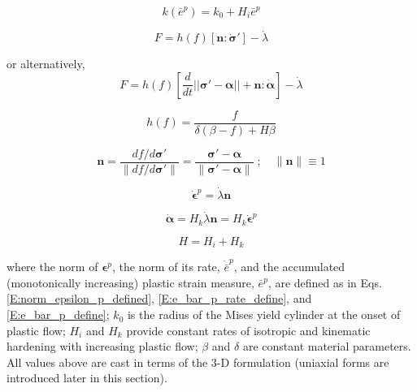 \documentclass[11pt]{report}
\numberwithin{equation}{section}
\newcommand{\bmf } {\boldsymbol }
\begin{document}
\begin{equation} \label{E:gp_isotropic}
k(\bar e^p) = k_0+H_i \bar e^p
\end{equation}

\begin{equation} \label{E:limit_surface}
F = h(f)[\bmf{n}:\dot{\bmf{\sigma}}']-\dot{\lambda}
\end{equation}

or alternatively,
\begin{equation} \label{E:limit_surface}
F = h(f) \left [\frac{d}{dt} ||\bmf{\sigma}'-\bmf{\alpha}||+ \bmf{n}:\dot{\bmf{\alpha}}\right]-\dot{\lambda}
\end{equation}


\begin{equation}\label{E:h_define}
h(f) = \frac{f}{\delta(\beta-f)+H\beta}
\end{equation}

\begin{equation}\label{E:n_define2}
\bmf n =  \frac {df/d\bmf{\sigma}'} {\parallel df/d\bmf{\sigma}' \parallel} =
\frac{\bmf \sigma' - \bmf \alpha} {\parallel \bmf \sigma' - \bmf \alpha \parallel }\;;
\quad \parallel \bmf n \parallel \equiv 1
\end{equation}

\begin{equation}\label{E:normal_flow}
\dot{\bmf{\epsilon}}^p=\dot{\lambda}\bmf{n}
\end{equation}

\begin{equation} \label{E:gp_kinematic}
\dot{\bmf{\alpha}}=H_k\dot{\lambda}\bmf{n}=H_k\dot{\bmf{\epsilon}}^p
\end{equation}

\begin{equation}
H = H_i + H_k
\end{equation}

\noindent where the norm of $\bmf \epsilon^p$, the norm of its rate, 
$\dot{\bar e}^p$, and the
accumulated (monotonically increasing) plastic strain
measure, $\bar e^p$, are defined as in Eqs.\;\eqref{E:norm_epsilon_p_defined},
\eqref{E:e_bar_p_rate_define}, and \eqref{E:e_bar_p_define};
$k_0$ is the radius of the Mises yield cylinder 
at the onset of plastic flow; $H_i$ and $H_k$ provide constant rates of isotropic and
kinematic hardening with increasing plastic flow; $\beta$ and $\delta$ are constant
material parameters. All values above are cast in terms 
of the 3-D formulation (uniaxial forms are introduced later in this section). 
\end{document}
